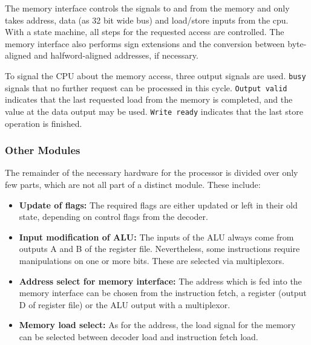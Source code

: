 The memory interface controls the signals to and from the memory and only takes address, data (as 32 bit wide bus) and load/store inputs from the cpu. With a state machine, all steps for the requested access are controlled. The memory interface also performs sign extensions and the conversion between byte-aligned and halfword-aligned addresses, if necessary.

To signal the CPU about the memory access, three output signals are used. \texttt{busy} signals that no further request can be processed in this cycle. \texttt{Output valid} indicates that the last requested load from the memory is completed, and the value at the data output may be used. \texttt{Write ready} indicates that the last store operation is finished. 

\subsubsection{Other Modules}
\label{subsubsec:othermodules}

The remainder of the necessary hardware for the processor is divided over only few parts, which are not all part of a distinct module. These include:
\begin{itemize}
\item \textbf{Update of flags: }The required flags are either updated or left in their old state, depending on control flags from the decoder.
\item \textbf{Input modification of ALU:} The inputs of the ALU always come from outputs A and B of the register file. Nevertheless, some instructions require manipulations on one or more bits. These are selected via multiplexors.
\item \textbf{Address select for memory interface:} The address which is fed into the memory interface can be chosen from the instruction fetch, a register (output D of register file) or the ALU output with a multiplexor.
\item \textbf{Memory load select:} As for the address, the load signal for the memory can be selected between decoder load and instruction fetch load.
\end{itemize}

